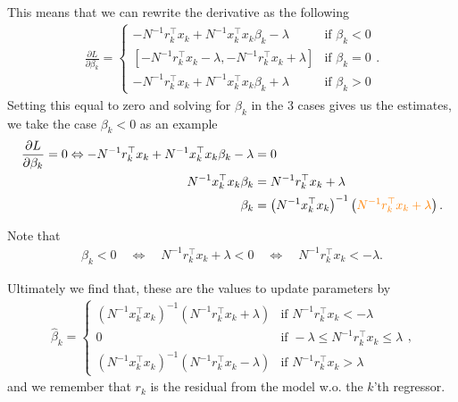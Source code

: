 \documentclass[aspectratio=169,10pt]{beamer}
\begin{document}
\begin{frame}{\secname}{\subsecname}
  This means that we can rewrite the derivative as the following
  \begin{align}
    \frac{\partial L}{\partial \beta_k} = 
    \begin{cases}
      -N^{-1} r_k^\top x_k + N^{-1} x_k^\top x_k\beta_k - \lambda &\text{if } \beta_k < 0 \\
      [-N^{-1} r_k^\top x_k - \lambda, -N^{-1} r_k^\top x_k + \lambda] &\text{if } \beta_k = 0 \\
      -N^{-1} r_k^\top x_k + N^{-1} x_k^\top x_k\beta_k + \lambda &\text{if } \beta_k > 0
    \end{cases}.
  \end{align}
  Setting this equal to zero and solving for $\beta_k$ in the 3 cases gives us the estimates, we take the case $\beta_k < 0$ as an example
  \begin{align}
    \frac{\partial L}{\partial \beta_k} = 0 \Leftrightarrow -N^{-1} r_k^\top x_k + N^{-1} x_k^\top x_k\beta_k - \lambda &= 0 \\
    N^{-1} x_k^\top x_k\beta_k &= N^{-1} r_k^\top x_k + \lambda \\
    \beta_k &=\left(N^{-1} x_k^\top x_k\right)^{-1}\left({\color{orange} N^{-1} r_k^\top x_k + \lambda}\right).
  \end{align}
\end{frame}

\begin{frame}{\secname}{\subsecname}
  Note that
  \begin{align}
    \beta_k < 0 \quad \Leftrightarrow \quad N^{-1}r_k^\top x_k + \lambda < 0 \quad \Leftrightarrow \quad N^{-1}r_k^\top x_k < - \lambda. 
  \end{align}

  Ultimately we find that, these are the values to update parameters by
  \begin{align}
    \hat{\beta}_k =
    \begin{cases}
      \left(N^{-1} x_k^\top x_k\right)^{-1}\left( N^{-1} r_k^\top x_k + \lambda\right) &\text{if } N^{-1}r_k^\top x_k < -\lambda\\
      0 &\text{if } -\lambda \leq N^{-1}r_k^\top x_k \leq \lambda\\
      \left(N^{-1} x_k^\top x_k\right)^{-1}\left( N^{-1} r_k^\top x_k - \lambda\right) &\text{if } N^{-1}r_k^\top x_k > \lambda
    \end{cases},
  \end{align}
  and we remember that $r_k$ is the residual from the model w.o.\! the $k$'th regressor.
\end{frame}
\end{document}
